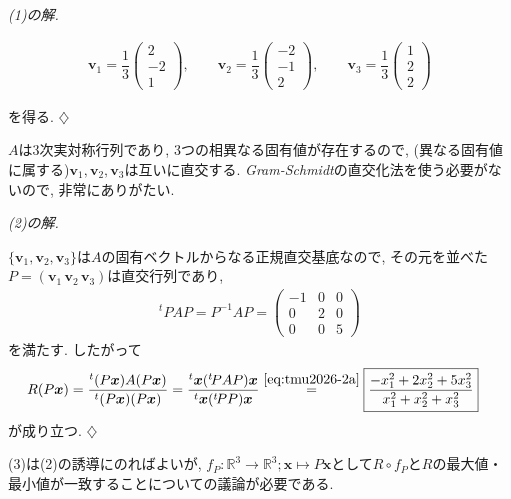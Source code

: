 \documentclass[titlepage]{jsarticle}
\numberwithin{equation}{section}
\newcommand{\R}{\mathbb{R}}%
\newenvironment{kaitou}[1][解]{%
\begin{proofbox}%
\textit{#1. }\ignorespaces
}{%
\hfill$\diamondsuit$%
\end{proofbox}%
}
\begin{document}
\begin{kaitou}[(1)の解]
\begin{answerbox}
\begin{align*}
\bm{v}_1 =
\dfrac{1}{3}
\begin{pmatrix}
2\\
-2\\
1
\end{pmatrix},\qquad
\bm{v}_2 =
\dfrac{1}{3}
\begin{pmatrix}
-2\\
-1\\
2
\end{pmatrix},\qquad
\bm{v}_3 =
\dfrac{1}{3}
\begin{pmatrix}
1\\
2\\
2
\end{pmatrix}
\end{align*}
\end{answerbox}
を得る.
\end{kaitou}
$A$は$3$次実対称行列であり, $3$つの相異なる固有値が存在するので, (異なる固有値に属する)$\bm{v}_1, \bm{v}_2, \bm{v}_3$は互いに直交する. \textit{Gram-Schmidt}の直交化法を使う必要がないので, 非常にありがたい.
\begin{kaitou}[(2)の解]
$\{\bm{v}_1, \bm{v}_2, \bm{v}_3\}$は$A$の固有ベクトルからなる正規直交基底なので, その元を並べた$P = (\bm{v}_1\,\bm{v}_2\,\bm{v}_3)$は直交行列であり, 
\begin{align}
{}^t\!PAP = P^{-1}AP = 
\begin{pmatrix}
-1 & 0 & 0\\
0 & 2 & 0\\
0 & 0 & 5
\end{pmatrix} \label{eq:tmu2026-2a}
\end{align}
を満たす. したがって
\begin{align*}
R(P\bm{x}) = \dfrac{{}^t(P\bm{x})A(P\bm{x})}{{}^t(P\bm{x})(P\bm{x})} &= \dfrac{{}^t\bm{x}({}^t\!PAP)\bm{x}}{{}^t\bm{x}({}^t\!PP)\bm{x}} \stackrel{\eqref{eq:tmu2026-2a}}{=} \boxed{\dfrac{-x_1^2 + 2x_2^2 + 5x_3^2}{x_1^2 + x_2^2 +  x_3^2}} 
\end{align*}
が成り立つ.
\end{kaitou}
(3)は(2)の誘導にのればよいが, $f_P : \R^3 \to \R^3 ; \bm{x} \mapsto P\bm{x}$として$R\circ f_P$と$R$の最大値・最小値が一致することについての議論が必要である.
\end{document}
